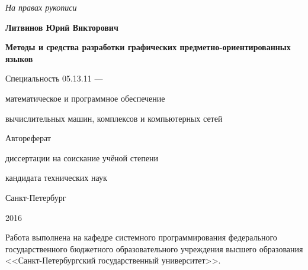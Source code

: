 \newcommand{\sfs}{\fontsize{10pt}{10pt}\selectfont}
\sfs %
\thispagestyle{empty}

\vspace{10mm}
\begin{flushright}
  \Large\textit{На правах рукописи}
\end{flushright}

\vspace{25mm}
\begin{center}
  \Large\bf{Литвинов Юрий Викторович}
\end{center}

\vspace{20mm}
\begin{center}
  {\bf \LARGE Методы и средства разработки графических предметно-ориентированных языков
\par}

\vspace{20mm}
{\Large
Специальность 05.13.11 ---\par
математическое и программное обеспечение\par
вычислительных машин, комплексов и компьютерных сетей
}

\vspace{15mm}
\LARGE Автореферат\par
\Large{диссертации на соискание учёной степени\par
кандидата технических наук}
\end{center}

\vspace{35mm}
\begin{center}
  \Large{Санкт-Петербург\par 2016}
\end{center}

\newpage
\thispagestyle{empty}

\small{
Работа выполнена на кафедре системного программирования федерального государственного
бюджетного образовательного учреждения высшего образования <<Санкт-Петербургский
государственный университет>>.
}

